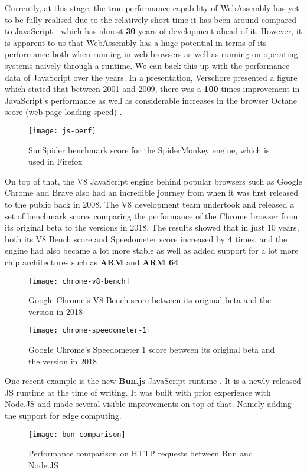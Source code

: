 Currently, at this stage, the true performance capability of WebAssembly has yet to be fully realised due to the relatively short time it has been around compared to JavaScript - which has almost \textbf{30} years of development ahead of it. However, it is apparent to us that WebAssembly has a huge potential in terms of its performance both when running in web browsers as well as running on operating systems naively through a runtime. We can back this up with the performance data of JavaScript over the years. In a presentation, Verschore presented a figure which stated that between 2001 and 2009, there was a \textbf{100} times improvement in JavaScript's performance as well as considerable increases in the browser Octane score (web page loading speed) \cite{exp24}.

\bigskip
\begin{figure}[!ht]
\centering
\texttt{[image: js-perf]}
\caption{\footnotesize{SunSpider benchmark score for the SpiderMonkey engine, which is used in Firefox \cite{exp24}}}
\captionsetup{aboveskip=0pt,font=it}
\end{figure}
\bigskip

On top of that, the V8 JavaScript engine \cite{int31} behind popular browsers such as Google Chrome \cite{exp25} and Brave \cite{exp26} also had an incredible journey from when it was first released to the public back in 2008. The V8 development team undertook and released a set of benchmark scores comparing the performance of the Chrome browser from its original beta to the versions in 2018. The results showed that in just 10 years, both its V8 Bench score \cite{exp27} and Speedometer score \cite{exp28} increased by \textbf{4} times, and the engine had also became a lot more stable as well as added support for a lot more chip architectures such as \textbf{ARM} and \textbf{ARM 64} \cite{exp29} \cite{exp30}.

\newpage
\bigskip
\begin{figure}[hp]
\centering
\texttt{[image: chrome-v8-bench]}
\caption{\footnotesize{Google Chrome's V8 Bench score between its original beta and the version in 2018 \cite{exp29}}}
\captionsetup{aboveskip=0pt,font=it}
\end{figure}
\bigskip

\bigskip
\begin{figure}[hp]
\centering
\texttt{[image: chrome-speedometer-1]}
\caption{\footnotesize{Google Chrome's Speedometer 1 score between its original beta and the version in 2018 \cite{exp29}}}
\captionsetup{aboveskip=0pt,font=it}
\end{figure}
\bigskip

One recent example is the new \textbf{Bun.js} JavaScript runtime \cite{exp31}. It is a newly released JS runtime at the time of writing. It was built with prior experience with Node.JS and made several visible improvements on top of that. Namely adding the support for edge computing.

\bigskip
\begin{figure}[hp]
\centering
\texttt{[image: bun-comparison]}
\caption{\footnotesize{Performance comparison on HTTP requests between Bun and Node.JS \cite{exp31}}}
\captionsetup{aboveskip=0pt,font=it}
\end{figure}
\bigskip